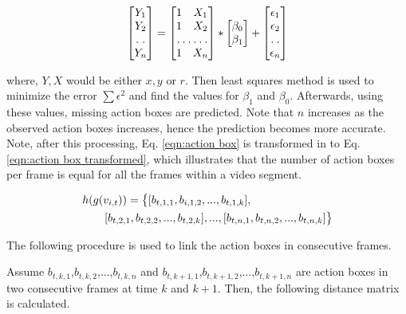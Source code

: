 \begin{equation}
\label{eqn:linear regression}
\begin{bmatrix}
    Y_{1}     \\
    Y_{2}     \\
    \hdotsfor{1} \\
    Y_{n}
\end{bmatrix}
=
\begin{bmatrix}
    1 & X_{1}     \\
    1 & X_{2}     \\
    \hdotsfor{2} \\
    1 & X_{n}
\end{bmatrix}
*
\begin{bmatrix}
    \beta_{0}     \\
    \beta_{1}
\end{bmatrix}
+
\begin{bmatrix}
    \epsilon_{1}     \\
    \epsilon_{2}    \\
    \hdotsfor{1} \\
    \epsilon_{n}
\end{bmatrix}
\end{equation}

where, $Y, X$ would be either $x,y$ or $r$. Then least squares method is used to minimize the error $\sum{\epsilon^2}$ and find the
values for $\beta_{1}$ and $\beta_{0}$. Afterwards, using these values, missing action boxes are predicted.
Note that $n$ increases as the observed action boxes
increases, hence the prediction becomes more accurate. Note, after this processing, Eq. \ref{eqn:action box}
is transformed in to Eq. \ref{eqn:action box transformed},
which illustrates that the number of action boxes per frame is equal for all the frames within a video segment.

\begin{equation}
\label{eqn:action box transformed}
\begin{split}
\MoveEqLeft
 h(g(v_{i,t})) = \big\{[b_{t,1,1},b_{i,1,2},...,b_{t,1,k}],\\
 & [b_{t,2,1},b_{t,2,2},...,b_{t,2,k}],...,[b_{t,n,1},b_{t,n,2},...,b_{t,n,k}]\big\}
\end{split}
\end{equation}


The following procedure
is used to link the action boxes in consecutive frames.

Assume $b_{t,k,1}$,$b_{t,k,2}$,...,$b_{t,k,n}$ and $b_{t,k+1,1}$,$b_{t,k+1,2}$,...,$b_{t,k+1,n}$  are action boxes in two
consecutive frames at time $k$ and $k+1$. Then, the following distance matrix is calculated.




